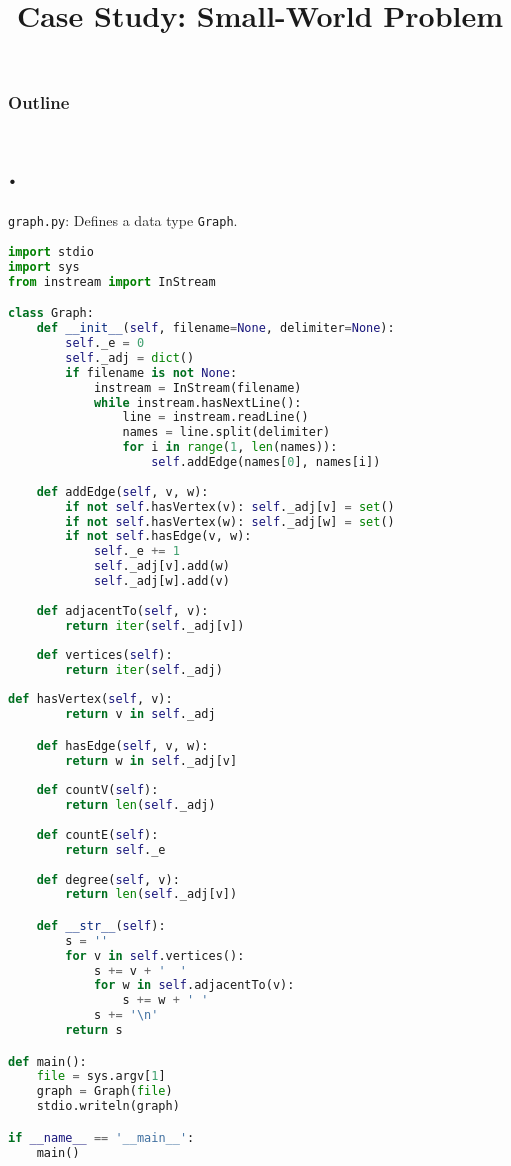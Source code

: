 \documentclass[8pt,a4paper,compress,handout]{beamer}
\title{Case Study: Small-World Problem}
\date{}
\begin{document}
\begin{frame}
\vfill
\titlepage
\end{frame}

\begin{frame}
\frametitle{Outline}
\tableofcontents
\end{frame}

\section{.}
\begin{frame}[fragile]
\begin{framed}
\tiny \lstinline{graph.py}: Defines a data type \lstinline{Graph}.
\end{framed}

\begin{lstlisting}[language=Python]
import stdio
import sys
from instream import InStream

class Graph:
    def __init__(self, filename=None, delimiter=None):
        self._e = 0
        self._adj = dict()
        if filename is not None:
            instream = InStream(filename)
            while instream.hasNextLine():
                line = instream.readLine()
                names = line.split(delimiter)
                for i in range(1, len(names)):
                    self.addEdge(names[0], names[i])
                
    def addEdge(self, v, w):
        if not self.hasVertex(v): self._adj[v] = set()
        if not self.hasVertex(w): self._adj[w] = set()
        if not self.hasEdge(v, w):
            self._e += 1
            self._adj[v].add(w)
            self._adj[w].add(v)
            
    def adjacentTo(self, v):
        return iter(self._adj[v])
    
    def vertices(self):
        return iter(self._adj)
\end{lstlisting}
\end{frame}

\begin{frame}[fragile]
\begin{lstlisting}[language=Python]
    def hasVertex(self, v):
        return v in self._adj

    def hasEdge(self, v, w):
        return w in self._adj[v]
    
    def countV(self):
        return len(self._adj)
    
    def countE(self):
        return self._e
    
    def degree(self, v):
        return len(self._adj[v])

    def __str__(self):
        s = ''
        for v in self.vertices():
            s += v + '  '
            for w in self.adjacentTo(v):
                s += w + ' '
            s += '\n'
        return s

def main():
    file = sys.argv[1]
    graph = Graph(file)
    stdio.writeln(graph)

if __name__ == '__main__':
    main()
\end{lstlisting}
\end{frame}
\end{document}
